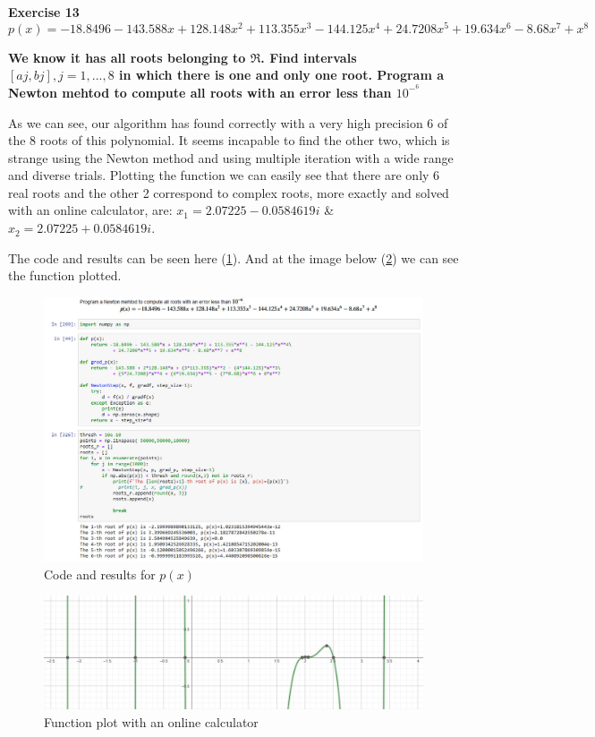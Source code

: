 \documentclass[12pt,letterpaper]{article}
\theoremstyle{definition}
\begin{document}
\textbf{Exercise 13} 
$$p(x) = -18.8496 - 143.588x + 128.148x^2 + 113.355x^3 - 144.125x^4 + 24.7208x^5 + 19.634x^6 - 8.68x^7 + x^8 $$

\textbf{We know it has all roots belonging to $\Re$. Find intervals $[aj, bj ], j = 1,...,8$ in which there is one and only one root. Program a Newton mehtod to compute all roots with an error less than $10^-^6$}

As we can see, our algorithm has found correctly with a very high precision 6 of the 8 roots of this polynomial. It seems incapable to find the other two, which is strange using the Newton method and using multiple iteration with a wide range and diverse trials. Plotting the function we can easily see that there are only 6 real roots and the other 2 correspond to complex roots, more exactly and solved with an online calculator, are: $x_1 = 2.07225 - 0.0584619i$ & $x_2 = 2.07225 + 0.0584619i$. 

The code and results can be seen here (\ref{fig:code}). And at the image below (\ref{fig:plot}) we can see the function plotted.

\begin{figure}[H]
    \centering
    \includegraphics[width=1.1\textwidth]{code.jpeg}
    \decoRule
    \caption{Code and results for $p(x)$}
    \label{fig:code}
\end{figure}


\begin{figure}[H]
    \centering
    \includegraphics[width=1\textwidth]{plot.jpeg}
    \decoRule
    \caption{Function plot with an online calculator}
    \label{fig:plot}
\end{figure}
\end{document}
